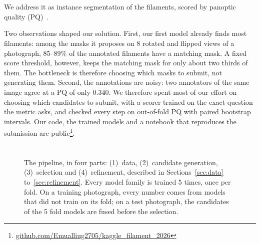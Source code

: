 \documentclass[sigconf]{acmart}
\begin{document}
\section{\texorpdfstring{}{Introduction}}
     We address it as instance segmentation of the filaments, scored by panoptic quality (PQ)~\cite{kirillov2019panoptic}.

    Two observations shaped our solution. First, our first model already finds most filaments: among the masks it proposes on 8 rotated and flipped views of a photograph, 85--89\% of the annotated filaments have a matching mask. A fixed score threshold, however, keeps the matching mask for only about two thirds of them. The bottleneck is therefore choosing which masks to submit, not generating them. Second, the annotations are noisy: two annotators of the same image agree at a PQ of only 0.340. 
    We therefore spent most of our effort on choosing which candidates to submit, with a scorer trained on the exact question the metric asks, and checked every step on out-of-fold PQ with paired bootstrap intervals. Our code, the trained models and a notebook that reproduces the submission are public\footnote{\href{https://github.com/Emualliug2705/kaggle_filament_2026}{github.com/Emualliug2705/kaggle\_filament\_2026}}.


\section{\texorpdfstring{}{Methodology}}\label{sec:methodology}

\begin{figure}[t]
\centering

\caption{The pipeline, in four parts: (1)~data, (2)~candidate generation, (3)~selection and (4)~refinement, described in Sections~\ref{sec:data} to~\ref{sec:refinement}. Every model family is trained 5 times, once per fold. On a training photograph, every number comes from models that did not train on its fold; on a test photograph, the candidates of the 5 fold models are fused before the selection.}
\label{fig:pipeline}
\end{figure}
\end{document}
